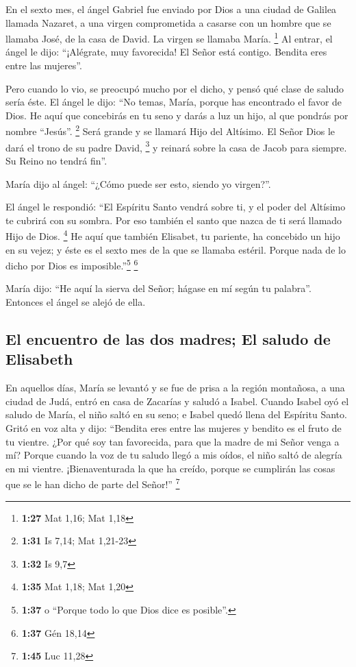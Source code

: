 \begin{paracol}{2}
 En el sexto mes, el ángel Gabriel fue enviado por Dios a
una ciudad de Galilea llamada Nazaret,  a una virgen
comprometida a casarse con un hombre que se llamaba José, de la casa de
David. La virgen se llamaba María. \footnote{\textbf{1:27} Mat 1,16; Mat
  1,18}  Al entrar, el ángel le dijo: ``¡Alégrate, muy
favorecida! El Señor está contigo. Bendita eres entre las mujeres''.

 Pero cuando lo vio, se preocupó mucho por el dicho, y
pensó qué clase de saludo sería éste.  El ángel le dijo:
``No temas, María, porque has encontrado el favor de Dios.
 He aquí que concebirás en tu seno y darás a luz un hijo,
al que pondrás por nombre ``Jesús''. \footnote{\textbf{1:31} Is 7,14;
  Mat 1,21-23}  Será grande y se llamará Hijo del
Altísimo. El Señor Dios le dará el trono de su padre David, \footnote{\textbf{1:32}
  Is 9,7}  y reinará sobre la casa de Jacob para siempre.
Su Reino no tendrá fin''.

 María dijo al ángel: ``¿Cómo puede ser esto, siendo yo
virgen?''.

 El ángel le respondió: ``El Espíritu Santo vendrá sobre
ti, y el poder del Altísimo te cubrirá con su sombra. Por eso también el
santo que nazca de ti será llamado Hijo de Dios. \footnote{\textbf{1:35}
  Mat 1,18; Mat 1,20}  He aquí que también Elisabet, tu
pariente, ha concebido un hijo en su vejez; y éste es el sexto mes de la
que se llamaba estéril.  Porque nada de lo dicho por Dios
es imposible.''\footnote{\textbf{1:37} o ``Porque todo lo que Dios dice
  es posible''.} \footnote{\textbf{1:37} Gén 18,14}

 María dijo: ``He aquí la sierva del Señor; hágase en mí
según tu palabra''. Entonces el ángel se alejó de ella.

\hypertarget{el-encuentro-de-las-dos-madres-el-saludo-de-elisabeth}{%
\subsection{El encuentro de las dos madres; El saludo de
Elisabeth}\label{el-encuentro-de-las-dos-madres-el-saludo-de-elisabeth}}

 En aquellos días, María se levantó y se fue de prisa a
la región montañosa, a una ciudad de Judá,  entró en casa
de Zacarías y saludó a Isabel.  Cuando Isabel oyó el
saludo de María, el niño saltó en su seno; e Isabel quedó llena del
Espíritu Santo.  Gritó en voz alta y dijo: ``Bendita eres
entre las mujeres y bendito es el fruto de tu vientre. 
¿Por qué soy tan favorecida, para que la madre de mi Señor venga a mí?
 Porque cuando la voz de tu saludo llegó a mis oídos, el
niño saltó de alegría en mi vientre.  ¡Bienaventurada la
que ha creído, porque se cumplirán las cosas que se le han dicho de
parte del Señor!'' \footnote{\textbf{1:45} Luc 11,28}


\end{paracol}
